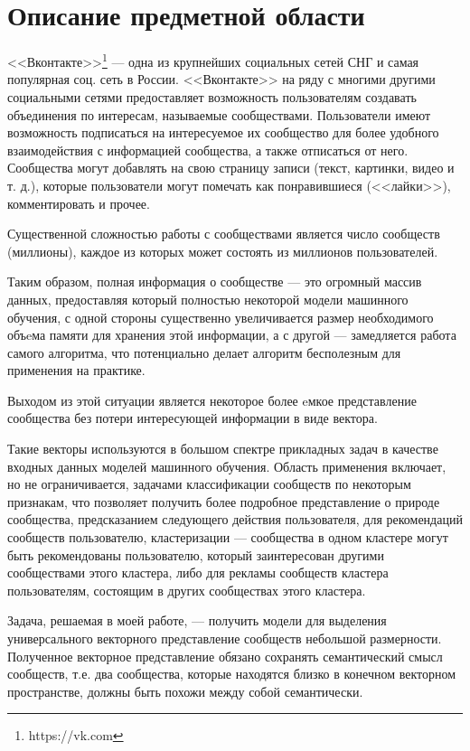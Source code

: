 \documentclass[times,specification,annotation]{itmo-student-thesis}
\begin{document}
\chapter{Описание предметной области}

<<Вконтакте>>\footnote{https://vk.com} --- одна из крупнейших социальных сетей СНГ и самая
популярная соц. сеть в России. <<Вконтакте>> на ряду с многими другими
социальными сетями предоставляет возможность пользователям создавать объединения по интересам,
называемые сообществами. Пользователи имеют возможность подписаться на
интересуемое их сообщество для более удобного взаимодействия с информацией
сообщества, а также отписаться от него. Сообщества могут добавлять на свою
страницу записи (текст, картинки, видео и т. д.), которые пользователи могут
помечать как понравившиеся (<<лайки>>), комментировать и прочее.

Существенной сложностью работы с сообществами является число сообществ (миллионы), каждое из которых может состоять из миллионов пользователей.  

Таким образом, полная информация о сообществе --- это огромный массив
данных, предоставляя который полностью некоторой модели машинного обучения,
с одной стороны существенно увеличивается размер необходимого объeма памяти для хранения этой информации, а с другой --- замедляется работа самого алгоритма, что потенциально делает алгоритм бесполезным для применения на практике.

Выходом из этой ситуации является некоторое более eмкое представление сообщества без потери интересующей информации в виде вектора.

Такие векторы используются в большом спектре прикладных задач в качестве входных данных моделей машинного обучения. Область применения включает, но не ограничивается, задачами классификации сообществ по некоторым признакам, что позволяет получить более подробное представление о природе сообщества, предсказанием следующего действия пользователя, для рекомендаций сообществ пользователю, кластеризации --- сообщества в одном кластере могут быть рекомендованы пользователю, который заинтересован другими сообществами этого кластера, либо для рекламы сообществ кластера пользователям, состоящим в других сообществах этого кластера. 

Задача, решаемая в моей работе, --- получить модели для выделения универсального векторного представление сообществ небольшой размерности. Полученное векторное представление обязано сохранять семантический смысл сообществ, т.е. два сообщества, которые находятся близко в конечном векторном пространстве, должны быть похожи между собой семантически. 
\end{document}
